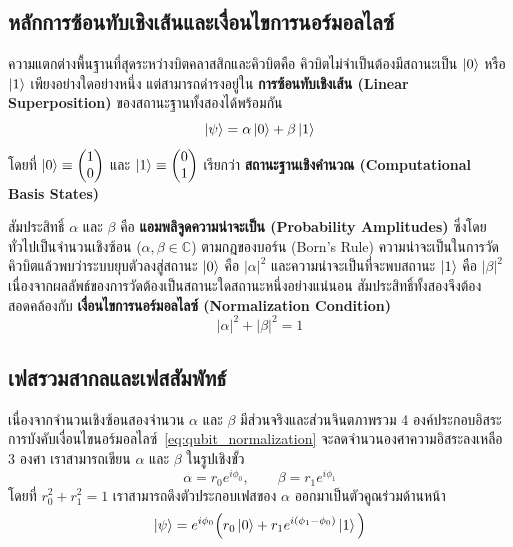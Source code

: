 \subsection{หลักการซ้อนทับเชิงเส้นและเงื่อนไขการนอร์มอลไลซ์}
ความแตกต่างพื้นฐานที่สุดระหว่างบิตคลาสสิกและคิวบิตคือ คิวบิตไม่จำเป็นต้องมีสถานะเป็น $\ket{0}$ หรือ $\ket{1}$ เพียงอย่างใดอย่างหนึ่ง แต่สามารถดำรงอยู่ใน \textbf{การซ้อนทับเชิงเส้น (Linear Superposition)} ของสถานะฐานทั้งสองได้พร้อมกัน
\begin{equation}
\ket{\psi} = \alpha \ket{0} + \beta \ket{1}
\label{eq:qubit_superposition}
\end{equation}
โดยที่ $\ket{0} \equiv \begin{pmatrix} 1 \\ 0 \end{pmatrix}$ และ $\ket{1} \equiv \begin{pmatrix} 0 \\ 1 \end{pmatrix}$ เรียกว่า \textbf{สถานะฐานเชิงคำนวณ (Computational Basis States)}

สัมประสิทธิ์ $\alpha$ และ $\beta$ คือ \textbf{แอมพลิจูดความน่าจะเป็น (Probability Amplitudes)} ซึ่งโดยทั่วไปเป็นจำนวนเชิงซ้อน ($\alpha, \beta \in \mathbb{C}$) ตามกฎของบอร์น (Born's Rule) ความน่าจะเป็นในการวัดคิวบิตแล้วพบว่าระบบยุบตัวลงสู่สถานะ $\ket{0}$ คือ $|\alpha|^2$ และความน่าจะเป็นที่จะพบสถานะ $\ket{1}$ คือ $|\beta|^2$ เนื่องจากผลลัพธ์ของการวัดต้องเป็นสถานะใดสถานะหนึ่งอย่างแน่นอน สัมประสิทธิ์ทั้งสองจึงต้องสอดคล้องกับ \textbf{เงื่อนไขการนอร์มอลไลซ์ (Normalization Condition)}
\begin{equation}
|\alpha|^2 + |\beta|^2 = 1
\label{eq:qubit_normalization}
\end{equation}

\subsection{เฟสรวมสากลและเฟสสัมพัทธ์}
เนื่องจากจำนวนเชิงซ้อนสองจำนวน $\alpha$ และ $\beta$ มีส่วนจริงและส่วนจินตภาพรวม 4 องค์ประกอบอิสระ การบังคับเงื่อนไขนอร์มอลไลซ์~\eqref{eq:qubit_normalization} จะลดจำนวนองศาความอิสระลงเหลือ 3 องศา เราสามารถเขียน $\alpha$ และ $\beta$ ในรูปเชิงขั้ว
\begin{equation}
\alpha = r_0 e^{i\phi_0}, \qquad \beta = r_1 e^{i\phi_1}
\end{equation}
โดยที่ $r_0^2 + r_1^2 = 1$ เราสามารถดึงตัวประกอบเฟสของ $\alpha$ ออกมาเป็นตัวคูณร่วมด้านหน้า
\begin{equation}
\ket{\psi} = e^{i\phi_0} \Big( r_0 \ket{0} + r_1 e^{i(\phi_1 - \phi_0)} \ket{1} \Big)
\end{equation}

